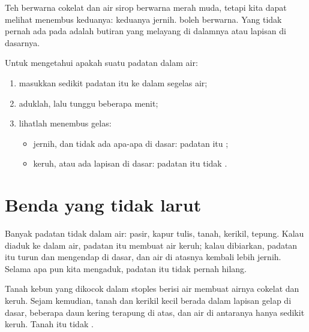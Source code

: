 \begin{remark}\label{rem:g2:mixing-and-dissolving:clear}
Teh berwarna cokelat dan air sirop berwarna merah muda, tetapi kita
dapat melihat menembus keduanya: keduanya jernih.  boleh
berwarna. Yang tidak pernah ada pada  adalah butiran yang
melayang di dalamnya atau lapisan di dasarnya.
\end{remark}

\begin{method}[Larutkah?]\label{met:g2:mixing-and-dissolving:test}
Untuk mengetahui apakah suatu padatan  dalam air:
\begin{enumerate}
  \item masukkan sedikit padatan itu ke dalam segelas air;
  \item aduklah, lalu tunggu beberapa menit;
  \item lihatlah menembus gelas:
    \begin{itemize}
      \item jernih, dan tidak ada apa-apa di dasar: padatan itu ;
      \item keruh, atau ada lapisan di dasar: padatan itu tidak .
    \end{itemize}
\end{enumerate}
\end{method}

\section{Benda yang tidak larut}

\begin{proposition}\label{prop:g2:mixing-and-dissolving:not}
Banyak padatan tidak  dalam air: pasir, kapur tulis, tanah,
kerikil, tepung. Kalau diaduk ke dalam air, padatan itu membuat air
keruh; kalau dibiarkan, padatan itu turun dan mengendap di dasar, dan
air di atasnya kembali lebih jernih. Selama apa pun kita mengaduk,
padatan itu tidak pernah hilang.
\end{proposition}

\begin{example}\label{ex:g2:mixing-and-dissolving:mud}
Tanah kebun yang dikocok dalam stoples berisi air membuat airnya cokelat
dan keruh. Sejam kemudian, tanah dan kerikil kecil berada dalam lapisan
gelap di dasar, beberapa daun kering terapung di atas, dan air di
antaranya hanya sedikit keruh. Tanah itu tidak .
\end{example}

